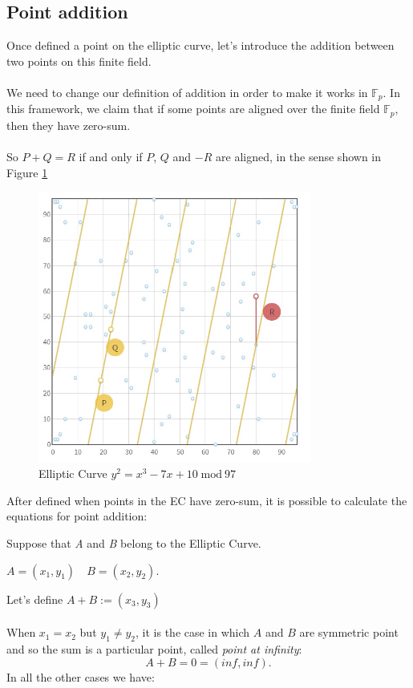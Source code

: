 \subsection{Point addition}
Once defined a point on the elliptic curve, let's introduce the addition between two points on this finite field.
\\ \\
We need to change our definition of addition in order to make it works in $\mathbb{F}_p$. In this framework, we claim that if some points are aligned over the finite field $\mathbb{F}_p$, then they have zero-sum.
\\ \\
So $P+Q=R$ if and only if $P$, $Q$ and $-R$ are aligned, in the sense shown in Figure \ref{fig:EC_aligned}
\begin{figure}[ht!]
	\centering
	\includegraphics[width=9cm]{Figures/EC_aligned.jpg}
	\caption{Elliptic Curve $y^2=x^3-7x+10 \; \textrm{mod} \ 97$}
	\label{fig:EC_aligned}
\end{figure}

\begin{flushleft}
	After defined when points in the EC have zero-sum, it is possible to calculate the equations for point addition:
\end{flushleft}
Suppose that \textit{A} and \textit{B} belong to the Elliptic Curve.

\begin{center}
	$ A=(x_1,y_1) \quad B=(x_2,y_2)$.
\end{center}
Let's define $ A+B :=(x_3,y_3) $ 
\\ \\
When $x_1=x_2$ but $y_1 \neq y_2$, it is the case in which $A$ and $B$ are symmetric point and so the sum is a particular point, called \textit{point at infinity}: 
\begin{equation*}
A+B=0=	(inf,inf) .
\end{equation*}
In all the other cases we have:




